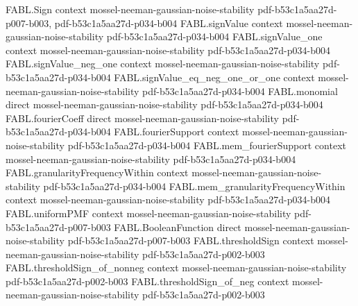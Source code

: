 \begin{theorem}
\label{FABL.correlatedPairPMF_expect_signValue_mul}
\leanok
{}
\proofstep
  {FABL.Sign}
  {context}
  {mossel-neeman-gaussian-noise-stability}
  {pdf-b53c1a5aa27d-p007-b003,
    pdf-b53c1a5aa27d-p034-b004}
\proofstep
  {FABL.signValue}
  {context}
  {mossel-neeman-gaussian-noise-stability}
  {pdf-b53c1a5aa27d-p034-b004}
\proofstep
  {FABL.signValue_one}
  {context}
  {mossel-neeman-gaussian-noise-stability}
  {pdf-b53c1a5aa27d-p034-b004}
\proofstep
  {FABL.signValue_neg_one}
  {context}
  {mossel-neeman-gaussian-noise-stability}
  {pdf-b53c1a5aa27d-p034-b004}
\proofstep
  {FABL.signValue_eq_neg_one_or_one}
  {context}
  {mossel-neeman-gaussian-noise-stability}
  {pdf-b53c1a5aa27d-p034-b004}
\proofstep
  {FABL.monomial}
  {direct}
  {mossel-neeman-gaussian-noise-stability}
  {pdf-b53c1a5aa27d-p034-b004}
\proofstep
  {FABL.fourierCoeff}
  {direct}
  {mossel-neeman-gaussian-noise-stability}
  {pdf-b53c1a5aa27d-p034-b004}
\proofstep
  {FABL.fourierSupport}
  {context}
  {mossel-neeman-gaussian-noise-stability}
  {pdf-b53c1a5aa27d-p034-b004}
\proofstep
  {FABL.mem_fourierSupport}
  {context}
  {mossel-neeman-gaussian-noise-stability}
  {pdf-b53c1a5aa27d-p034-b004}
\proofstep
  {FABL.granularityFrequencyWithin}
  {context}
  {mossel-neeman-gaussian-noise-stability}
  {pdf-b53c1a5aa27d-p034-b004}
\proofstep
  {FABL.mem_granularityFrequencyWithin}
  {context}
  {mossel-neeman-gaussian-noise-stability}
  {pdf-b53c1a5aa27d-p034-b004}
\proofstep
  {FABL.uniformPMF}
  {context}
  {mossel-neeman-gaussian-noise-stability}
  {pdf-b53c1a5aa27d-p007-b003}
\proofstep
  {FABL.BooleanFunction}
  {direct}
  {mossel-neeman-gaussian-noise-stability}
  {pdf-b53c1a5aa27d-p007-b003}
\proofstep
  {FABL.thresholdSign}
  {context}
  {mossel-neeman-gaussian-noise-stability}
  {pdf-b53c1a5aa27d-p002-b003}
\proofstep
  {FABL.thresholdSign_of_nonneg}
  {context}
  {mossel-neeman-gaussian-noise-stability}
  {pdf-b53c1a5aa27d-p002-b003}
\proofstep
  {FABL.thresholdSign_of_neg}
  {context}
  {mossel-neeman-gaussian-noise-stability}
  {pdf-b53c1a5aa27d-p002-b003}
\proofstep

\end{theorem}
